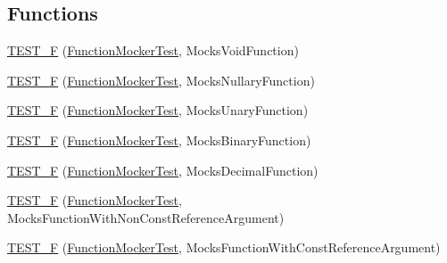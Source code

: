 \subsection*{Functions}
\begin{DoxyCompactItemize}
\item 
\mbox{\hyperlink{namespacetesting_1_1gmock__generated__function__mockers__test_aee64a5117451830331c321aecd10025f}{T\+E\+S\+T\+\_\+F}} (\mbox{\hyperlink{classtesting_1_1gmock__generated__function__mockers__test_1_1_function_mocker_test}{Function\+Mocker\+Test}}, Mocks\+Void\+Function)
\item 
\mbox{\hyperlink{namespacetesting_1_1gmock__generated__function__mockers__test_a0a1348d6814b9bc02ad5b2ac46361ac0}{T\+E\+S\+T\+\_\+F}} (\mbox{\hyperlink{classtesting_1_1gmock__generated__function__mockers__test_1_1_function_mocker_test}{Function\+Mocker\+Test}}, Mocks\+Nullary\+Function)
\item 
\mbox{\hyperlink{namespacetesting_1_1gmock__generated__function__mockers__test_a835348f70c0335c9213153f72138d12f}{T\+E\+S\+T\+\_\+F}} (\mbox{\hyperlink{classtesting_1_1gmock__generated__function__mockers__test_1_1_function_mocker_test}{Function\+Mocker\+Test}}, Mocks\+Unary\+Function)
\item 
\mbox{\hyperlink{namespacetesting_1_1gmock__generated__function__mockers__test_aa8d2e25f60ad3ac49736ee90fb7ac190}{T\+E\+S\+T\+\_\+F}} (\mbox{\hyperlink{classtesting_1_1gmock__generated__function__mockers__test_1_1_function_mocker_test}{Function\+Mocker\+Test}}, Mocks\+Binary\+Function)
\item 
\mbox{\hyperlink{namespacetesting_1_1gmock__generated__function__mockers__test_a279ba48bf6f937eecfc12530b9dde497}{T\+E\+S\+T\+\_\+F}} (\mbox{\hyperlink{classtesting_1_1gmock__generated__function__mockers__test_1_1_function_mocker_test}{Function\+Mocker\+Test}}, Mocks\+Decimal\+Function)
\item 
\mbox{\hyperlink{namespacetesting_1_1gmock__generated__function__mockers__test_a852587f21316c0341b60b29d44cd61ea}{T\+E\+S\+T\+\_\+F}} (\mbox{\hyperlink{classtesting_1_1gmock__generated__function__mockers__test_1_1_function_mocker_test}{Function\+Mocker\+Test}}, Mocks\+Function\+With\+Non\+Const\+Reference\+Argument)
\item 
\mbox{\hyperlink{namespacetesting_1_1gmock__generated__function__mockers__test_a5367aba117b37aff1ceb4be3d4732559}{T\+E\+S\+T\+\_\+F}} (\mbox{\hyperlink{classtesting_1_1gmock__generated__function__mockers__test_1_1_function_mocker_test}{Function\+Mocker\+Test}}, Mocks\+Function\+With\+Const\+Reference\+Argument)

\end{DoxyCompactItemize}
